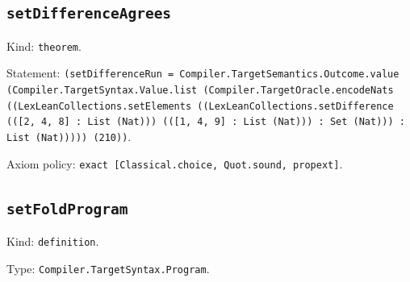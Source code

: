 \documentclass[11pt]{article}
\begin{document}
\subsection*{\texttt{setDifferenceAgrees}}
\noindent Kind: \texttt{theorem}.\par
\noindent Statement: \texttt{(setDifferenceRun = Compiler.TargetSemantics.Outcome.value (Compiler.TargetSyntax.Value.list (Compiler.TargetOracle.encodeNats ((LexLeanCollections.setElements ((LexLeanCollections.setDifference (([2, 4, 8] : List (Nat))) (([1, 4, 9] : List (Nat))) : Set (Nat))) : List (Nat))))) (210))}.\par
\noindent Axiom policy: \texttt{exact [Classical.choice, Quot.sound, propext]}.\par
\subsection*{\texttt{setFoldProgram}}
\noindent Kind: \texttt{definition}.\par
\noindent Type: \texttt{Compiler.TargetSyntax.Program}.\par
\end{document}
